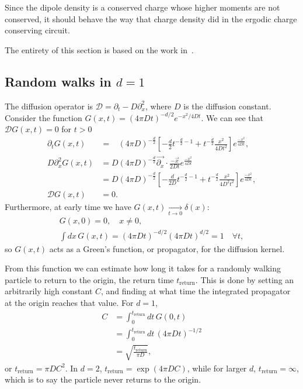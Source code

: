 \documentclass[a4paper,12pt]{article}
\newcommand{\ret}{\text{return}}
\newcommand{\nn}{\nonumber\\}
\begin{document}
Since the dipole density is a conserved charge whose higher moments are not conserved, it should behave the way that charge density did in the ergodic charge conserving circuit.

The entirety of this section is based on the work in~\cite{PaiFracton}.

\subsection{Random walks in $d=1$} \label{sub:walks}

The diffusion operator is $\mathcal{D} = \partial_t-D\partial_x^2$, where $D$ is the diffusion constant. Consider the function $G(x,t)=(4\pi Dt)^{-d/2} e^{-x^2/4Dt}$. We can see that $\mathcal{D}G(x,t)=0$ for $t>0$ 
\begin{align}
\partial_t G(x,t) &= \phantom{D}(4\pi D)^{-\frac{d}{2}} \left[-\frac{d}{2} 
	t^{-\frac{d}{2}-1} + t^{-\frac{d}{2}}\frac{x^2}{4Dt^2} \right]
	e^{\frac{-x^2}{4Dt}},\\
D\partial_x^2 G(x,t) &= D(4\pi D)^{-\frac{d}{2}} \vec{\partial_x}\cdot 
	\frac{-\vec{x}}{2Dt}e^{\frac{-x^2}{4Dt}} \nn
&= D(4\pi D)^{-\frac{d}{2}} \left[-\frac{d}{2D} 
	t^{-\frac{d}{2}
	-1} + t^{-\frac{d}{2}}\frac{x^2}{4D^2t^2} \right]e^{\frac{-x^2}{4Dt}}, \\ 
\mathcal{D}G(x,t) &= 0.
\end{align}
Furthermore, at early time we have $G(x,t)\xrightarrow[t\to0]{}\delta(x)$:
\begin{align}
G(x,0) = 0, \quad x\ne 0,\\
\int dx\, G(x,t) = (4\pi Dt)^{-d/2}(4\pi Dt)^{d/2}=1\quad \forall t,
\end{align}
so $G(x,t)$ acts as a Green's function, or propagator, for the diffusion kernel.

From this function we can estimate how long it takes for a randomly walking particle to return to the origin, the return time $t_\ret$. This is done by setting an arbitrarily high constant $C$, and finding at what time the integrated propagator at the origin reaches that value. For $d=1$,
\begin{align}
C &= \int_{0}^{t_\ret}dt\,G(0,t)\\
&= \int_{0}^{t_\ret}dt\, (4\pi Dt)^{-1/2}\\
&= \sqrt{\frac{t_\ret}{\pi D}},
\end{align}
or $t_\ret=\pi D C^2$. In $d=2$, $t_\ret=\exp(4\pi DC)$, while for larger $d$, $t_\ret=\infty$, which is to say the particle never returns to the origin. 
\end{document}
